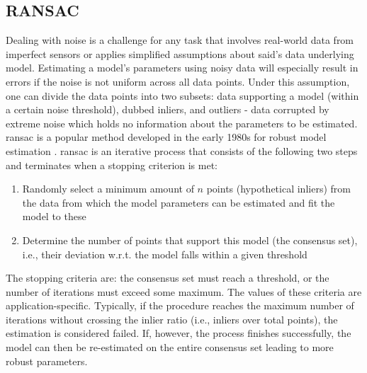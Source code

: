 \documentclass[headsepline, hidelinks, footsepline, footinclude=false, oneside, fontsize=11pt, paper=a4, listof=totoc, bibliography=totoc]{scrbook}
\begin{document}
\subsection{RANSAC \label{ransac}}
\label{sec:org68c2884}
    Dealing with noise is a challenge for any task that involves real-world data from imperfect sensors or applies simplified assumptions about said's data underlying model.
Estimating a model's parameters using noisy data will especially result in errors if the noise is not uniform across all data points.
Under this assumption, one can divide the data points into two subsets: data supporting a model (within a certain noise threshold), dubbed inliers, and outliers - data corrupted by extreme noise which holds no information about the parameters to be estimated.
\gls{ransac} is a popular method developed in the early 1980s for robust model estimation \cite{fischlerRandomSampleConsensus1981}.
\gls{ransac} is an iterative process that consists of the following two steps and terminates when a stopping criterion is met:

\begin{enumerate}
\item Randomly select a minimum amount of \(n\) points (hypothetical inliers) from the data from which the model parameters can be estimated and fit the model to these
\item Determine the number of points that support this model (the consensus set), i.e., their deviation w.r.t. the model falls within a given threshold
\end{enumerate}

The stopping criteria are: the consensus set must reach a threshold, or the number of iterations must exceed some maximum. The values of these criteria are application-specific.
Typically, if the procedure reaches the maximum number of iterations without crossing the inlier ratio (i.e., inliers over total points), the estimation is considered failed.
If, however, the process finishes successfully, the model can then be re-estimated on the entire consensus set leading to more robust parameters.
\end{document}
